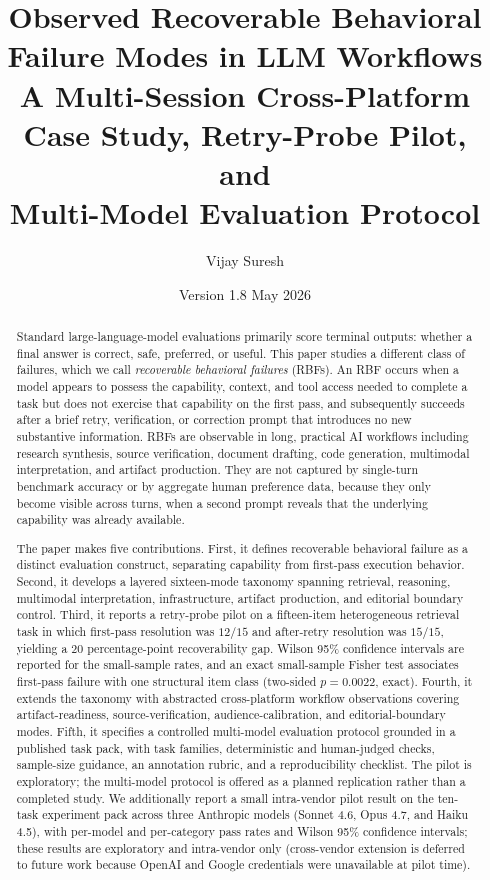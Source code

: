 \documentclass[11pt]{article}
\title{\textbf{Observed Recoverable Behavioral Failure Modes in LLM Workflows}\\
       \large A Multi-Session Cross-Platform Case Study, Retry-Probe Pilot, and\\
       Multi-Model Evaluation Protocol}
\author{Vijay Suresh}
\date{Version 1.8 \quad May 2026}
\begin{document}
\maketitle

\begin{abstract}
Standard large-language-model evaluations primarily score terminal outputs: whether a final answer is correct, safe, preferred, or useful. This paper studies a different class of failures, which we call \emph{recoverable behavioral failures} (RBFs). An RBF occurs when a model appears to possess the capability, context, and tool access needed to complete a task but does not exercise that capability on the first pass, and subsequently succeeds after a brief retry, verification, or correction prompt that introduces no new substantive information. RBFs are observable in long, practical AI workflows including research synthesis, source verification, document drafting, code generation, multimodal interpretation, and artifact production. They are not captured by single-turn benchmark accuracy or by aggregate human preference data, because they only become visible across turns, when a second prompt reveals that the underlying capability was already available.

The paper makes five contributions. First, it defines recoverable behavioral failure as a distinct evaluation construct, separating capability from first-pass execution behavior. Second, it develops a layered sixteen-mode taxonomy spanning retrieval, reasoning, multimodal interpretation, infrastructure, artifact production, and editorial boundary control. Third, it reports a retry-probe pilot on a fifteen-item heterogeneous retrieval task in which first-pass resolution was $12/15$ and after-retry resolution was $15/15$, yielding a $20$ percentage-point recoverability gap. Wilson 95\% confidence intervals are reported for the small-sample rates, and an exact small-sample Fisher test associates first-pass failure with one structural item class (two-sided $p = 0.0022$, exact). Fourth, it extends the taxonomy with abstracted cross-platform workflow observations covering artifact-readiness, source-verification, audience-calibration, and editorial-boundary modes. Fifth, it specifies a controlled multi-model evaluation protocol grounded in a published task pack, with task families, deterministic and human-judged checks, sample-size guidance, an annotation rubric, and a reproducibility checklist. The pilot is exploratory; the multi-model protocol is offered as a planned replication rather than a completed study. We additionally report a small intra-vendor pilot result on the ten-task experiment pack across three Anthropic models (Sonnet 4.6, Opus 4.7, and Haiku 4.5), with per-model and per-category pass rates and Wilson 95\% confidence intervals; these results are exploratory and intra-vendor only (cross-vendor extension is deferred to future work because OpenAI and Google credentials were unavailable at pilot time).
\end{abstract}
\end{document}
